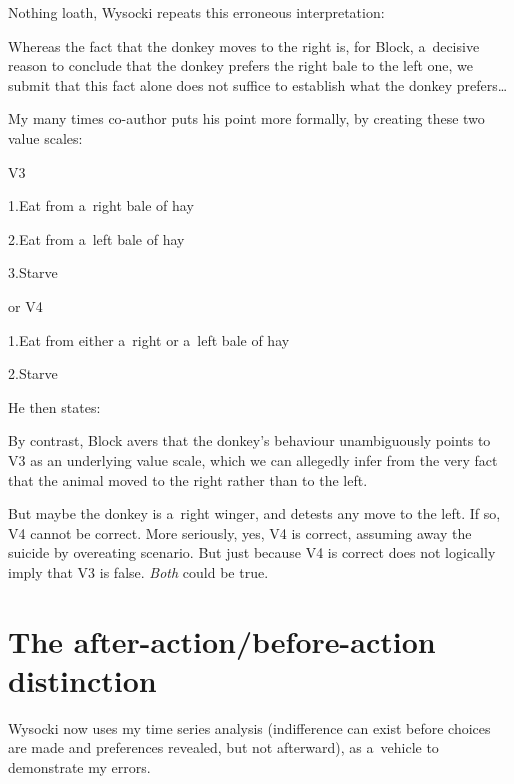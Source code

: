 Nothing loath, Wysocki repeats this erroneous interpretation:



Whereas the fact that the donkey moves to the right is, for Block, a~decisive reason to conclude that the donkey prefers the right bale to the left one, we submit that this fact alone does not suffice to establish what the donkey prefers…



My many times co-author puts his point more formally, by creating these two value scales:



V3



1.Eat from a~right bale of hay



2.Eat from a~left bale of hay



3.Starve



or V4



1.Eat from either a~right or a~left bale of hay



2.Starve



He then states:



By contrast, Block avers that the donkey's behaviour unambiguously points to V3 as an underlying value scale, which we can allegedly infer from the very fact that the animal moved to the right rather than to the left.



But maybe the donkey is a~right winger, and detests any move to the left. If so, V4 cannot be correct. More seriously, yes, V4 is correct, assuming away the suicide by overeating scenario. But just because V4 is correct does not logically imply that V3 is false. \textit{Both} could be true.



\section{The after-action/before-action distinction }

Wysocki now uses my time series analysis (indifference can exist before choices are made and preferences revealed, but not afterward), as a~vehicle to demonstrate my errors.



